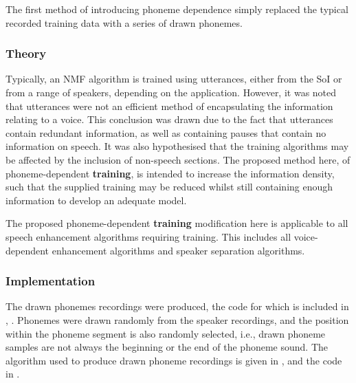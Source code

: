 The first method of introducing phoneme dependence simply replaced
the typical recorded training data with a series of drawn phonemes.


\subsubsection*{Theory}

Typically, an \ac{NMF} algorithm is trained using utterances, either
from the \ac{SoI} or from a range of speakers, depending on the application.
However, it was noted that utterances were not an efficient method
of encapsulating the information relating to a voice. This conclusion
was drawn due to the fact that utterances contain redundant information,
as well as containing pauses that contain no information on speech.
It was also hypothesised that the training algorithms may be affected
by the inclusion of non-speech sections. The proposed method here,
of phoneme-dependent\textbf{ training}, is intended to increase the
information density, such that the supplied training may be reduced
whilst still containing enough information to develop an adequate
model.

The proposed phoneme-dependent\textbf{ training} modification here
is applicable to all speech enhancement algorithms requiring training.
This includes all voice-dependent enhancement algorithms and speaker
separation algorithms.


\subsubsection*{Implementation}

The drawn phonemes recordings were produced, the code for which is
included in , \textit{}.
Phonemes were drawn randomly from the speaker recordings, and the
position within the phoneme segment is also randomly selected, i.e.,
drawn phoneme samples are not always the beginning or the end of the
phoneme sound. The algorithm used to produce drawn phoneme recordings
is given in , and the code in
.

